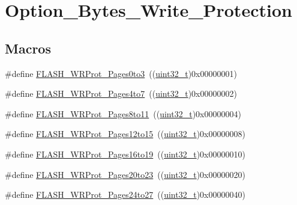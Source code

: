 \hypertarget{group___option___bytes___write___protection}{}\section{Option\+\_\+\+Bytes\+\_\+\+Write\+\_\+\+Protection}
\label{group___option___bytes___write___protection}
\subsection*{Macros}
\begin{DoxyCompactItemize}
\item 
\#define \hyperlink{group___option___bytes___write___protection_gac5c6f6155e4ebae0978a3d2a0d991e68}{F\+L\+A\+S\+H\+\_\+\+W\+R\+Prot\+\_\+\+Pages0to3}~((\hyperlink{_p_e___types_8h_a33594304e786b158f3fb30289278f5af}{uint32\+\_\+t})0x00000001)
\item 
\#define \hyperlink{group___option___bytes___write___protection_ga1b33c4de30c55331e7e60c0795c824ad}{F\+L\+A\+S\+H\+\_\+\+W\+R\+Prot\+\_\+\+Pages4to7}~((\hyperlink{_p_e___types_8h_a33594304e786b158f3fb30289278f5af}{uint32\+\_\+t})0x00000002)
\item 
\#define \hyperlink{group___option___bytes___write___protection_ga7eca7a8b11accdd6dadf3445847e1a57}{F\+L\+A\+S\+H\+\_\+\+W\+R\+Prot\+\_\+\+Pages8to11}~((\hyperlink{_p_e___types_8h_a33594304e786b158f3fb30289278f5af}{uint32\+\_\+t})0x00000004)
\item 
\#define \hyperlink{group___option___bytes___write___protection_gaa02b9439f75982e2e1c14f8af9a8c091}{F\+L\+A\+S\+H\+\_\+\+W\+R\+Prot\+\_\+\+Pages12to15}~((\hyperlink{_p_e___types_8h_a33594304e786b158f3fb30289278f5af}{uint32\+\_\+t})0x00000008)
\item 
\#define \hyperlink{group___option___bytes___write___protection_gaa589ce30909c3a9a0bffc8a59b6013fb}{F\+L\+A\+S\+H\+\_\+\+W\+R\+Prot\+\_\+\+Pages16to19}~((\hyperlink{_p_e___types_8h_a33594304e786b158f3fb30289278f5af}{uint32\+\_\+t})0x00000010)
\item 
\#define \hyperlink{group___option___bytes___write___protection_ga537e0f85899e13ca2ed93455e537d950}{F\+L\+A\+S\+H\+\_\+\+W\+R\+Prot\+\_\+\+Pages20to23}~((\hyperlink{_p_e___types_8h_a33594304e786b158f3fb30289278f5af}{uint32\+\_\+t})0x00000020)
\item 
\#define \hyperlink{group___option___bytes___write___protection_ga1d6b94b48e0dd21949139267b90a08ef}{F\+L\+A\+S\+H\+\_\+\+W\+R\+Prot\+\_\+\+Pages24to27}~((\hyperlink{_p_e___types_8h_a33594304e786b158f3fb30289278f5af}{uint32\+\_\+t})0x00000040)

\end{DoxyCompactItemize}
